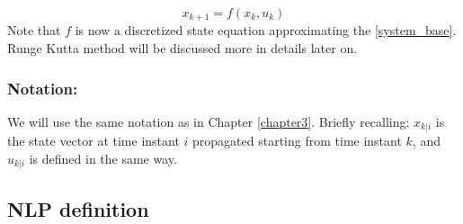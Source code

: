 \begin{equation*}
	{x}_{k+1}=f(x_k,u_k)
\end{equation*}
Note that $f$ is now a discretized state equation approximating the \ref{system_base}. Runge Kutta method will be discussed more in details later on.

\subsubsection*{Notation:}
We will use the same notation as in Chapter \ref{chapter3}. Briefly recalling: ${x}_{k|i}$ is the state vector at time instant $i$ propagated starting from time instant $k$, and ${u}_{k|i}$ is defined in the same way.

\subsection{NLP definition}


